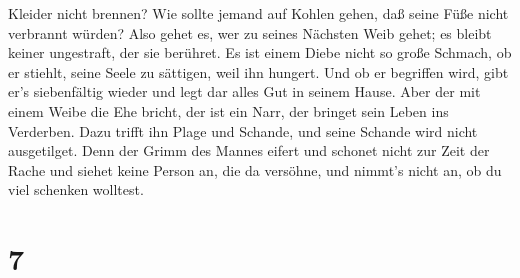 Kleider nicht brennen?  Wie sollte jemand auf Kohlen gehen,
daß seine Füße nicht verbrannt würden?  Also gehet es, wer
zu seines Nächsten Weib gehet; es bleibt keiner ungestraft, der sie
berühret.  Es ist einem Diebe nicht so große Schmach, ob er
stiehlt, seine Seele zu sättigen, weil ihn hungert.  Und ob
er begriffen wird, gibt er's siebenfältig wieder und legt dar alles Gut
in seinem Hause.  Aber der mit einem Weibe die Ehe bricht,
der ist ein Narr, der bringet sein Leben ins Verderben. 
Dazu trifft ihn Plage und Schande, und seine Schande wird nicht
ausgetilget.  Denn der Grimm des Mannes eifert und schonet
nicht zur Zeit der Rache  und siehet keine Person an, die
da versöhne, und nimmt's nicht an, ob du viel schenken wolltest.

\hypertarget{section-6}{%
\section{7}\label{section-6}}

